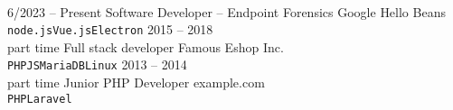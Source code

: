 \documentclass[9pt]{developercv} %
\begin{document}
\vspace{0.5cm} %



\begin{minipage}[t]{0.4\textwidth} %
	\vspace{-\baselineskip} %
	
	\lorem \lorem \lorem \lorem \lorem\\ %
\end{minipage}
\hfill %
\begin{minipage}[t]{0.5\textwidth} %
	\vspace{-\baselineskip} %
	
	\begin{barchart}{5.5} %
	\end{barchart}
\end{minipage}




\begin{entrylist}
	\entry
		{6/2023 -- Present}
		{Software Developer -- Endpoint Forensics}
		{Google}
		{Hello Beans\\ \texttt{node.js}\slashsep\texttt{Vue.js}\slashsep\texttt{Electron}}
	\entry
		{2015 -- 2018\\\footnotesize{part time}}
		{Full stack developer}
		{Famous Eshop Inc.}
		{\lorem\lorem\\ \texttt{PHP}\slashsep\texttt{JS}\slashsep\texttt{MariaDB}\slashsep\texttt{Linux}}
	\entry
		{2013 -- 2014\\\footnotesize{part time}}
		{Junior PHP Developer}
		{example.com}
		{\lorem\lorem\\ \texttt{PHP}\slashsep\texttt{Laravel}}
\end{entrylist}
\end{document}
